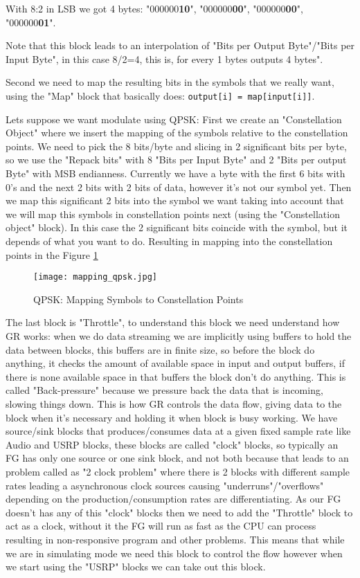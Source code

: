 \documentclass[a4paper, 10pt, conference]{ieeeconf}      %
\begin{document}
    With 8:2 in LSB we got 4 bytes: "000000\textbf{10}", "000000\textbf{00}", "000000\textbf{00}", "000000\textbf{01}".
    
    Note that this block leads to an interpolation of "Bits per Output Byte"/"Bits per Input Byte", in this case 8/2=4, this is, for every 1 bytes outputs 4 bytes". 
        
        Second we need to map the resulting bits in the symbols that we really want, using the "Map" block that basically does: \verb|output[i] = map[input[i]]|.
    
    Lets suppose we want modulate using QPSK: 
        First we create an "Constellation Object" where we insert the mapping of the symbols relative to the constellation points. 
        We need to pick the 8 bits/byte and slicing in 2 significant bits per byte, so we use the "Repack bits" with 8 "Bits per Input Byte" and 2 "Bits per output Byte" with MSB endianness. Currently we have a byte with the first 6 bits with 0's and the next 2 bits with 2 bits of data, however it's not our symbol yet.
        Then we map this significant 2 bits into the symbol we want taking into account that we will map this symbols in constellation points next (using the "Constellation object" block). In this case the 2 significant bits coincide with the symbol, but it depends of what you want to do.
        Resulting in mapping into the constellation points in the Figure   \ref{fig:mapping_qpsk}
        \begin{figure}
            \centering
            \texttt{[image: mapping\_qpsk.jpg]}
            \caption{QPSK: Mapping Symbols to Constellation Points}
            \label{fig:mapping_qpsk}
        \end{figure}
        
        The last block is "Throttle", to understand this block we need understand how GR works: when we do data streaming we are implicitly using buffers to hold the data between blocks, this buffers are in finite size, so before the block do anything, it checks the amount of available space in input and output buffers, if there is none available space in that buffers the block don't do anything. This is called "Back-pressure" because we pressure back the data that is incoming, slowing things down. This is how GR controls the data flow, giving data to the block when it's necessary and holding it when block is busy working. We have source/sink blocks that produces/consumes data at a given fixed sample rate like Audio and USRP blocks, these blocks are called "clock" blocks, so typically an FG has only one source or one sink block, and not both because that leads to an problem called as "2 clock problem" where there is 2 blocks with different sample rates leading a asynchronous clock sources causing "underruns"/"overflows" depending on the production/consumption rates are differentiating. As our FG doesn't has any of this "clock" blocks then we need to add the "Throttle" block to act as a clock, without it the FG will run as fast as the CPU can process resulting in non-responsive program and other problems. This means that while we are in simulating mode we need this block to control the flow however when we start using the "USRP" blocks we can take out this block.
        
\end{document}
